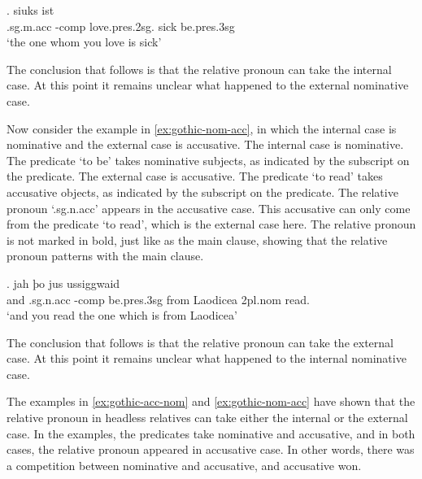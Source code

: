 \exg.    siuks ist\\
 .\ac{sg}.\ac{m}.\ac{acc} -\ac{comp} love.\ac{pres}.2\ac{sg}.\scsub{[acc]} sick be.\ac{pres}.3\ac{sg}\scsub{[nom]}\\
 `the one whom you love is sick' \label{ex:gothic-acc-nom}

The conclusion that follows is that the relative pronoun can take the internal case. At this point it remains unclear what happened to the external nominative case.

Now consider the example in \ref{ex:gothic-nom-acc}, in which the internal case is nominative and the external case is accusative.
The internal case is nominative. The predicate  `to be' takes nominative subjects, as indicated by the subscript on the predicate.
The external case is accusative. The predicate  `to read' takes accusative objects, as indicated by the subscript on the predicate.
The relative pronoun  `.\ac{sg}.\ac{n}.\ac{acc}' appears in the accusative case. This accusative can only come from the predicate  `to read', which is the external case here. The relative pronoun is not marked in bold, just like as the main clause, showing that the relative pronoun patterns with the main clause.

\exg. jah þo     jus ussiggwaid\\
 and .\ac{sg}.\ac{n}.\ac{acc} -\ac{comp} be.\ac{pres}.3\ac{sg}\scsub{[nom]} from Laodicea 2\ac{pl}.\ac{nom} read.\scsub{[acc]}\\
 `and you read the one which is from Laodicea' \label{ex:gothic-nom-acc}

The conclusion that follows is that the relative pronoun can take the external case. At this point it remains unclear what happened to the internal nominative case.

The examples in \ref{ex:gothic-acc-nom} and \ref{ex:gothic-nom-acc} have shown that the relative pronoun in headless relatives can take either the internal or the external case. In the examples, the predicates take nominative and accusative, and in both cases, the relative pronoun appeared in accusative case. In other words, there was a competition between nominative and accusative, and accusative won.

